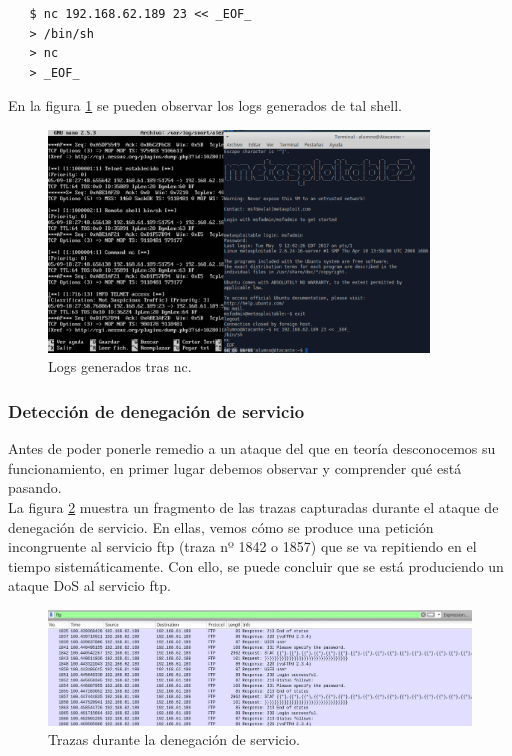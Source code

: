\documentclass[a4,12pt,onecolum]{article}
\begin{document}
\begin{enumerate}
  \begin{verbatim}
   $ nc 192.168.62.189 23 << _EOF_
   > /bin/sh
   > nc
   > _EOF_
  \end{verbatim}

  En la figura \ref{fig:snort9} se pueden observar los logs generados de tal shell.

  \begin{figure}[htbp]
  \centering
  \includegraphics[width=0.9\textwidth]{./images/Snortnc.png}
  \caption{Logs generados tras nc.}
  \label{fig:snort9}
  \end{figure}

\end{enumerate}

\subsubsection{Detección de denegación de servicio}

Antes de poder ponerle remedio a un ataque del que en teoría desconocemos su funcionamiento, en primer lugar debemos observar y comprender qué está pasando. \\

La figura \ref{fig:snort10} muestra un fragmento de las trazas capturadas durante el ataque de denegación de servicio. En ellas, vemos cómo se produce una petición incongruente al servicio ftp (traza nº 1842 o 1857) que se va repitiendo en el tiempo sistemáticamente. Con ello, se puede concluir que se está produciendo un ataque DoS al servicio ftp.

\begin{figure}[htbp]
\centering
\includegraphics[width=1.0\textwidth]{./images/SNORTtrazas.png}
\caption{Trazas durante la denegación de servicio.}
\label{fig:snort10}
\end{figure}
\end{document}
